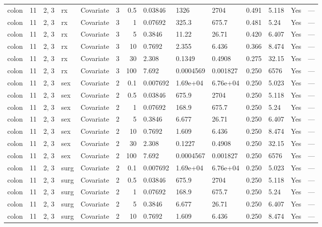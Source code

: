 \begin{tabular}{lrlllrrlllllll}
  colon & 11 & 2, 3 & rx & Covariate & 3 &   0.5 & 0.03846 & 1326 & 2704 & 0.491 & 5.118 & Yes & --- \\ 
  colon & 11 & 2, 3 & rx & Covariate & 3 &     1 & 0.07692 & 325.3 & 675.7 & 0.481 & 5.24 & Yes & --- \\ 
  colon & 11 & 2, 3 & rx & Covariate & 3 &     5 & 0.3846 & 11.22 & 26.71 & 0.420 & 6.407 & Yes & --- \\ 
  colon & 11 & 2, 3 & rx & Covariate & 3 &    10 & 0.7692 & 2.355 & 6.436 & 0.366 & 8.474 & Yes & --- \\ 
  colon & 11 & 2, 3 & rx & Covariate & 3 &    30 & 2.308 & 0.1349 & 0.4908 & 0.275 & 32.15 & Yes & --- \\ 
  colon & 11 & 2, 3 & rx & Covariate & 3 &   100 & 7.692 & 0.0004569 & 0.001827 & 0.250 & 6576 & Yes & --- \\ 
  colon & 11 & 2, 3 & sex & Covariate & 2 &   0.1 & 0.007692 & 1.69e+04 & 6.76e+04 & 0.250 & 5.023 & Yes & --- \\ 
  colon & 11 & 2, 3 & sex & Covariate & 2 &   0.5 & 0.03846 & 675.9 & 2704 & 0.250 & 5.118 & Yes & --- \\ 
  colon & 11 & 2, 3 & sex & Covariate & 2 &     1 & 0.07692 & 168.9 & 675.7 & 0.250 & 5.24 & Yes & --- \\ 
  colon & 11 & 2, 3 & sex & Covariate & 2 &     5 & 0.3846 & 6.677 & 26.71 & 0.250 & 6.407 & Yes & --- \\ 
  colon & 11 & 2, 3 & sex & Covariate & 2 &    10 & 0.7692 & 1.609 & 6.436 & 0.250 & 8.474 & Yes & --- \\ 
  colon & 11 & 2, 3 & sex & Covariate & 2 &    30 & 2.308 & 0.1227 & 0.4908 & 0.250 & 32.15 & Yes & --- \\ 
  colon & 11 & 2, 3 & sex & Covariate & 2 &   100 & 7.692 & 0.0004567 & 0.001827 & 0.250 & 6576 & Yes & --- \\ 
  colon & 11 & 2, 3 & surg & Covariate & 2 &   0.1 & 0.007692 & 1.69e+04 & 6.76e+04 & 0.250 & 5.023 & Yes & --- \\ 
  colon & 11 & 2, 3 & surg & Covariate & 2 &   0.5 & 0.03846 & 675.9 & 2704 & 0.250 & 5.118 & Yes & --- \\ 
  colon & 11 & 2, 3 & surg & Covariate & 2 &     1 & 0.07692 & 168.9 & 675.7 & 0.250 & 5.24 & Yes & --- \\ 
  colon & 11 & 2, 3 & surg & Covariate & 2 &     5 & 0.3846 & 6.677 & 26.71 & 0.250 & 6.407 & Yes & --- \\ 
  colon & 11 & 2, 3 & surg & Covariate & 2 &    10 & 0.7692 & 1.609 & 6.436 & 0.250 & 8.474 & Yes & --- \\ 

\end{tabular}
